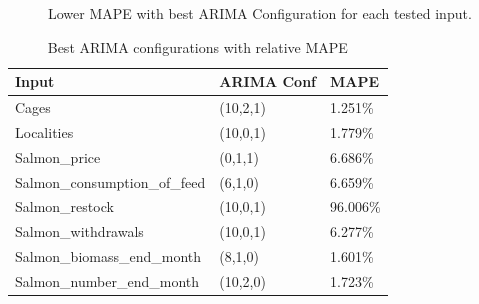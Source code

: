 \newpage

\begin{figure}[H]
    \caption{Lower MAPE with best ARIMA Configuration for each tested input.}
\end{figure}

\begin{table}[ht] 
	\centering
    \begin{tabular}{ | l | l | l |}
            \hline
Input							&	ARIMA Conf	&	MAPE	\\ \hline
Cages							&	(10,2,1)	&	1.251\%	\\ \hline
Localities						&	(10,0,1)	&	1.779\%	\\ \hline
Salmon\_price 					&	(0,1,1)		&	6.686\%	\\ \hline
Salmon\_consumption\_of\_feed	&	(6,1,0)		&	6.659\%	\\ \hline
Salmon\_restock 				&	(10,0,1)	&	96.006\%	\\ \hline
Salmon\_withdrawals 			&	(10,0,1)	&	6.277\%	\\ \hline
Salmon\_biomass\_end\_month		&	(8,1,0)		&	1.601\%	\\ \hline
Salmon\_number\_end\_month 		&	(10,2,0)	&	1.723\%	\\ \hline
    \end{tabular}  
    \caption{Best ARIMA configurations with relative MAPE}
    \label{table: Best ARIMA configurations with relative MAPE result in the Evaluation Test} 
\end{table}

\newpage


